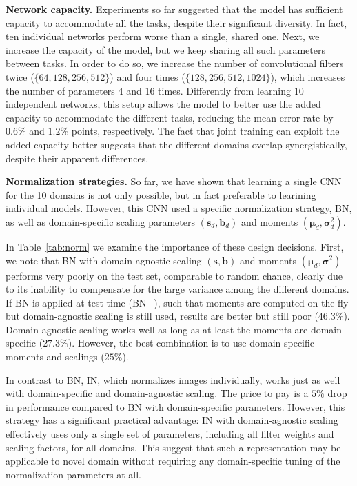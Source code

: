 \documentclass[10pt,twocolumn,letterpaper]{article}
\renewcommand{\paragraph}[1]{\par\medskip\noindent\textbf{#1}}
\begin{document}
\paragraph{Network capacity.} Experiments so far suggested that the model has sufficient capacity to accommodate all the tasks, despite their significant diversity. In fact, ten individual networks perform worse than a single, shared one. Next, we increase the capacity of the model, but we keep sharing all such parameters between tasks. In order to do so, we increase the number of convolutional filters twice ($\{64, 128, 256, 512\}$) and four times ($\{128, 256, 512, 1024\}$), which increases the number of parameters 4 and 16 times. Differently from learning 10 independent networks, this setup allows the model to better use the added capacity to accommodate the different tasks, reducing the mean error rate by $0.6\%$ and $1.2\%$ points, respectively. The fact that joint training can exploit the added capacity better suggests that the different domains overlap synergistically, despite their apparent differences.

\paragraph{Normalization strategies.} So far, we have shown that learning a single CNN for the 10 domains is not only possible, but in fact preferable to learining individual models. However, this CNN used a specific normalization strategy, BN, as well as domain-specific scaling parameters $(\bm s_d, \bm b_d)$ and moments $(\bm\mu_d,\bm\sigma_d^2)$.

In Table~\ref{tab:norm} we examine the importance of these design decisions. First, we note that BN with domain-agnostic scaling $(\bm s, \bm b)$ and moments $(\bm\mu_d,\bm\sigma^2)$ performs very poorly on the test set, comparable to random chance, clearly due to its inability to compensate for the large variance among the different domains. If BN is applied at test time (BN+), such that moments are computed on the fly but domain-agnostic scaling is still used, results are better but still poor ($46.3\%$). Domain-agnostic scaling works well as long as at least the moments are domain-specific ($27.3\%$). However, the best combination is to use domain-specific moments and scalings ($25\%$).


In contrast to BN, IN, which normalizes images individually, works just as well with domain-specific and domain-agnostic scaling. The price to pay is a $5\%$ drop in performance compared to BN with domain-specific parameters. However, this strategy has a significant practical advantage: IN with domain-agnostic scaling effectively uses only a single set of parameters, including all filter weights and scaling factors, for all domains. This suggest that such a representation may be applicable to novel domain without requiring any domain-specific tuning of the normalization parameters at all.
\end{document}

